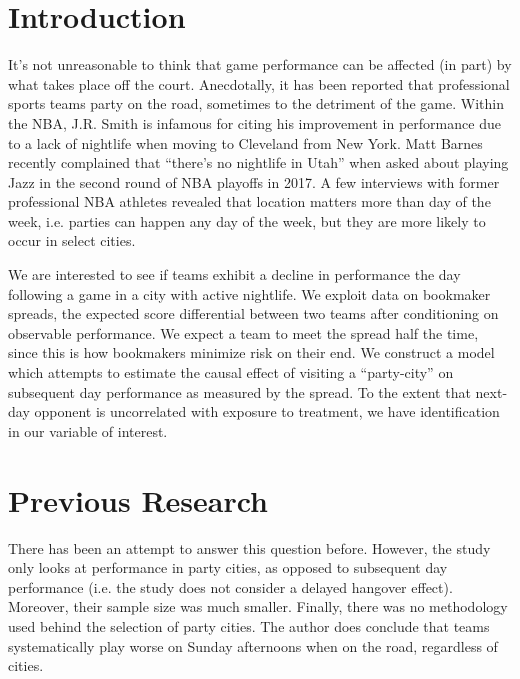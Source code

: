 \documentclass[letterpaper,12pt]{article}
\begin{document}

\section{Introduction}
It's not unreasonable to think that game performance can be affected 
(in part) by what takes place off the court. 
Anecdotally, it has been reported that professional sports teams party on 
the road, sometimes to the detriment of the game.\cite{hoch}
Within the NBA, J.R. Smith is infamous for citing his improvement in performance due to a
lack of nightlife when moving to Cleveland from New York.\cite{price,ley}
Matt Barnes recently complained that ``there's no nightlife in Utah'' when 
asked about playing Jazz in the second round of NBA playoffs in 2017.\cite{cestone}
A few interviews with former professional NBA athletes revealed that location
matters more than day of the week, i.e. parties can happen any day of the week,
but they are more likely to occur in select cities.

We are interested to see if 
teams exhibit a decline in performance the day following a game in a city 
with active nightlife. We exploit data on bookmaker spreads, the expected score 
differential between two teams after conditioning on observable performance. 
We expect a team to meet the spread half the time, since this is how bookmakers 
minimize risk on their end. We construct a model which attempts to 
estimate the causal effect of  visiting a ``party-city'' on subsequent day 
performance as measured by the spread. To the extent that next-day
opponent is uncorrelated with exposure to treatment, we have identification in our variable of interest.

\section{Previous Research}
There has been an attempt to answer this question before.\cite{ezekowitz} 
However, the study only
looks at performance in party cities, as opposed to subsequent day performance (i.e. the study does not consider a delayed hangover effect). Moreover, their sample size was much smaller. 
Finally, there was no methodology used behind the selection of party cities. The author does conclude
that teams systematically play worse on Sunday afternoons when on the road,
regardless of cities.
\end{document}
